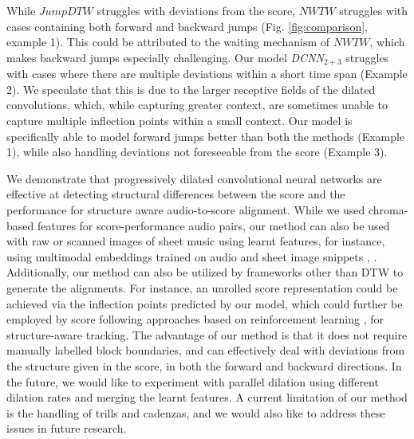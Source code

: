 \documentclass{article}
\begin{document}
While \begin{math}\textit{JumpDTW}\end{math} struggles with deviations from the score, \begin{math}\textit{NWTW}\end{math} struggles with cases containing both forward and backward jumps (Fig. \ref{fig:comparison}, example 1). This could be attributed to the waiting mechanism of \begin{math}NWTW\end{math}, which makes backward jumps especially challenging. Our model \emph{DCNN}${}_{2+3}$ struggles with cases where there are multiple deviations within a short time span (Example 2). We speculate that this is due to the larger receptive fields of the dilated convolutions, which, while capturing greater context, are sometimes unable to capture multiple inflection points within a small context. Our model is specifically able to model forward jumps better than both the methods  (Example 1), while also handling deviations not foreseeable from the score (Example 3).
\vspace{-0.1cm}
\par We demonstrate that progressively dilated convolutional neural networks are effective at detecting structural differences between the score and the performance for structure aware audio-to-score alignment. While we used chroma-based features for score-performance audio pairs, our method can also be used with raw or scanned images of sheet music using learnt features, for instance, using multimodal embeddings trained on audio and sheet image snippets \cite{dorfer2018learning}, \cite{balke2019learning}. Additionally, our method can also be utilized by frameworks other than DTW to generate the alignments. For instance, an unrolled score representation could be achieved via the inflection points predicted by our model, which could further be employed by score following approaches based on reinforcement learning \cite{dorfer2018learning2}, \cite{henkel2019score} for structure-aware tracking.
The advantage of our method is that it does not require manually labelled block boundaries, and can effectively deal with deviations from the structure given in the score, in both the forward and backward directions.
 In the future, we would like to experiment with parallel  dilation using different dilation rates and merging the learnt features. A current limitation of our method is the handling of trills and cadenzas, and we would also like to address these issues in future research. 


\end{document}
